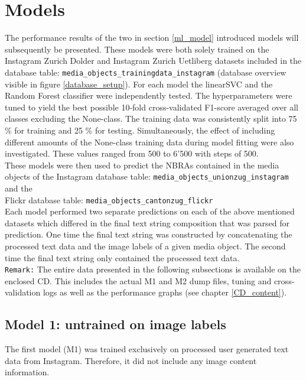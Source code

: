 \section{Models} \label{results_models}
The performance results of the two in section \ref{ml_model} introduced models will subsequently be presented. These models were both solely trained on the Instagram Zurich Dolder and Instagram Zurich Uetliberg datasets included in the database table: \texttt{media\_objects\_trainingdata\_instagram} (database overview visible in figure \ref{database_setup}). For each model the linearSVC and the Random Forest classifier were independently tested. The hyperparameters were tuned to yield the best possible 10-fold cross-validated F1-score averaged over all classes excluding the None-class. The training data was consistently split into 75 \% for training and 25 \% for testing. Simultaneously, the effect of including different amounts of the None-class training data during model fitting were also investigated. These values ranged from 500 to 6'500 with steps of 500.\\
These models were then used to predict the NBRAs contained in the media objects of the Instagram database table: \texttt{media\_objects\_unionzug\_instagram} and the \\Flickr database table: \texttt{media\_objects\_cantonzug\_flickr}\\
Each model performed two separate predictions on each of the above mentioned datasets which differed in the final text string composition that was parsed for prediction. One time the final text string was constructed by concatenating the processed text data and the image labels of a given media object. The second time the final text string only contained the processed text data.\\
\newline
\texttt{Remark:} The entire data presented in the following subsections is available on the enclosed CD. This includes the actual M1 and M2 dump files, tuning and cross-validation logs as well as the performance graphs (see chapter \ref{CD_content}).

\subsection{Model 1: untrained on image labels}
The first model (M1) was trained exclusively on processed user generated text data from Instagram. Therefore, it did not include any image content information.

